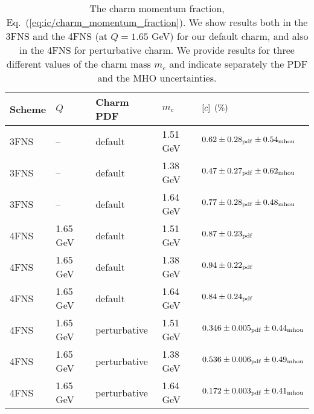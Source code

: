 \begin{table}[t]
  \footnotesize
  \centering
    \renewcommand{\arraystretch}{1.30}
\begin{tabularx}{\textwidth}{C{2.0cm}C{2.3cm}C{2.2cm}C{2.2cm}C{5.6cm}}
  \toprule
  Scheme  & $Q$ & Charm PDF & $m_c$  &  $\left[ c\right]~\left(\%\right)$ \\
  \midrule
  \midrule
 3FNS  & --  &default  &  1.51 GeV  &   $ 0.62\pm0.28_{\rm pdf}\pm 0.54_{\rm mhou} $ \\
 3FNS  & --  &default  &  1.38 GeV  &   $ 0.47\pm0.27_{\rm pdf}\pm 0.62_{\rm mhou} $ \\
 3FNS  & --  &default  &  1.64 GeV  &    $ 0.77\pm0.28_{\rm
  pdf}\pm 0.48_{\rm mhou} $ \\
  \midrule

 4FNS  & 1.65 GeV  & default  &  1.51 GeV  &   $0.87 \pm 0.23_{\rm pdf}$  \\
 4FNS  & 1.65 GeV  & default &  1.38 GeV  &   $0.94 \pm 0.22_{\rm pdf}$  \\
 4FNS  & 1.65 GeV  & default   &  1.64 GeV  &  $0.84 \pm 0.24_{\rm pdf}$  \\
  \midrule
 \midrule
 4FNS  & 1.65 GeV   & perturbative  &  1.51 GeV  &   $0.346\pm 0.005_{\rm pdf}\pm 0.44_{\rm mhou}$ \\
 4FNS  & 1.65 GeV   & perturbative  &  1.38 GeV  &    $0.536\pm 0.006_{\rm pdf}\pm 0.49_{\rm mhou}$ \\
 4FNS  & 1.65 GeV   & perturbative  &  1.64 GeV  &    $0.172\pm 0.003_{\rm pdf}\pm 0.41_{\rm mhou}$ \\
\bottomrule
\end{tabularx}
\vspace{0.3cm}
\caption{\label{tab:ic/momfrac_lowQ}
  The charm momentum fraction, Eq.~(\ref{eq:ic/charm_momentum_fraction}).
  We show  results both in the 3FNS and the 4FNS (at $Q=1.65$ GeV)
  for our default charm, and also in the 4FNS for perturbative charm.
We provide results for  three different values of the charm mass $m_c$ and
indicate separately the PDF and the MHO uncertainties.
}
\end{table}


